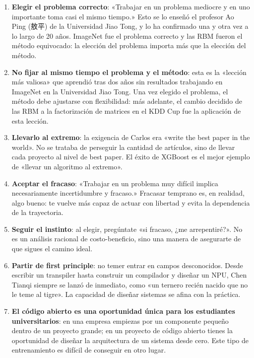 \begin{enumerate}
    \item \textbf{Elegir el problema correcto}: «Trabajar en un problema mediocre y en uno importante toma casi el mismo tiempo.» Esto se lo enseñó el profesor Ao Ping (敖平) de la Universidad Jiao Tong, y lo ha confirmado una y otra vez a lo largo de 20 años. ImageNet fue el problema correcto y las RBM fueron el método equivocado: la elección del problema importa más que la elección del método.

    \item \textbf{No fijar al mismo tiempo el problema y el método}: esta es la «lección más valiosa» que aprendió tras dos años sin resultados trabajando en ImageNet en la Universidad Jiao Tong. Una vez elegido el problema, el método debe ajustarse con flexibilidad: más adelante, el cambio decidido de las RBM a la factorización de matrices en el KDD Cup fue la aplicación de esta lección.

    \item \textbf{Llevarlo al extremo}: la exigencia de Carlos era «write the best paper in the world». No se trataba de perseguir la cantidad de artículos, sino de llevar cada proyecto al nivel de best paper. El éxito de XGBoost es el mejor ejemplo de «llevar un algoritmo al extremo».

    \item \textbf{Aceptar el fracaso}: «Trabajar en un problema muy difícil implica necesariamente incertidumbre y fracaso.» Fracasar temprano es, en realidad, algo bueno: te vuelve más capaz de actuar con libertad y evita la dependencia de la trayectoria.

    \item \textbf{Seguir el instinto}: al elegir, pregúntate «si fracaso, ¿me arrepentiré?». No es un análisis racional de costo-beneficio, sino una manera de asegurarte de que sigues el camino ideal.

    \item \textbf{Partir de first principle}: no temer entrar en campos desconocidos. Desde escribir un transpiler hasta construir un compilador y diseñar un NPU, Chen Tianqi siempre se lanzó de inmediato, como «un ternero recién nacido que no le teme al tigre». La capacidad de diseñar sistemas se afina con la práctica.

    \item \textbf{El código abierto es una oportunidad única para los estudiantes universitarios}: en una empresa empiezas por un componente pequeño dentro de un proyecto grande; en un proyecto de código abierto tienes la oportunidad de diseñar la arquitectura de un sistema desde cero. Este tipo de entrenamiento es difícil de conseguir en otro lugar.
\end{enumerate}

